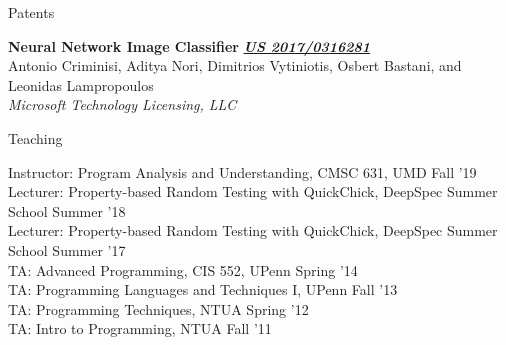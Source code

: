 \documentclass{resume} %
\begin{document}

\begin{rSection}{Patents}

{\bf Neural Network Image Classifier} \hfill {\href{https://patentimages.storage.googleapis.com/44/ec/9f/3f90c94a602fda/US20170316281A1.pdf}{\bf \em US 2017/0316281}}\\
Antonio Criminisi, Aditya Nori, Dimitrios Vytiniotis, Osbert Bastani, and Leonidas Lampropoulos\\
{\em Microsoft Technology Licensing, LLC}

  
\end{rSection}


\newcommand{\teach}[3]{
  {#1: #2} \hfill #3 \\
  }

\begin{rSection}{Teaching}

  \teach{Instructor}{Program Analysis and Understanding, CMSC 631, UMD}{Fall '19}
  \teach{Lecturer}{Property-based Random Testing with QuickChick, DeepSpec Summer School}{Summer '18}
  \teach{Lecturer}{Property-based Random Testing with QuickChick, DeepSpec Summer School}{Summer '17}  
  \teach{TA}{Advanced Programming, CIS 552, UPenn}{Spring '14}
  \teach{TA}{Programming Languages and Techniques I, UPenn}{Fall '13}
  \teach{TA}{Programming Techniques, NTUA}{Spring '12}
  \teach{TA}{Intro to Programming, NTUA}{Fall '11}
\end{rSection}



\newcommand{\talk}[3]{
  {\bf #1} \\ %
  {#3}
  }

\newcommand{\apls}[1]{Athens PL Seminar, NTUA, #1}
\end{document}
